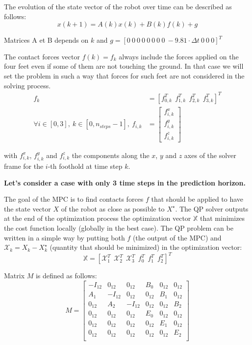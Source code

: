 \documentclass[a4paper,11pt]{article}
\begin{document}
The evolution of the state vector of the robot over time can be described as follows:
\begin{equation}
x(k+1) = A(k) x(k) + B(k) f(k) + g
\end{equation}

Matrices A et B depends on $k$ and $g = [0 ~ 0 ~ 0 ~ 0 ~ 0 ~ 0 ~ 0 ~ 0 ~ -9.81 \cdot \Delta t~ 0 ~ 0 ~ 0]^T$

The contact forces vector $f(k) = f_k$ always include the forces applied on the four feet even if some of them are not touching the ground. In that case we will set the problem in such a way that forces for such feet are not considered in the solving process.
\begin{align}
f_k &= [f_{0,k}^T ~~ f_{1,k}^T ~~ f_{2,k}^T ~~ f_{3,k}^T]^T \\
\forall i \in [0, 3],~k\in[0, n_{steps}-1], ~f_{i, k} &= \begin{bmatrix} f^x_{i,k} \\ f^y_{i,k} \\ f^z_{i,k} \end{bmatrix}
\end{align}

with $f^x_{i,k}$, $f^y_{i,k}$ and $f^z_{i,k}$ the components along the $x$, $y$ and $z$ axes of the solver frame for the $i$-th foothold at time step $k$.

\textbf{Let's consider a case with only 3 time steps in the prediction horizon.}

The goal of the MPC is to find contacts forces $f$ that should be applied to have the state vector $X$ of the robot as close as possible to $X^\star$. The QP solver outputs at the end of the optimization process the optimization vector $\mathbb{X}$ that minimizes the cost function locally (globally in the best case). The QP problem can be written in a simple way by putting both $f$ (the output of the MPC) and $\mathcal{X}_k = X_k - X_k^\star$ (quantity that should be minimized) in the optimization vector:
\begin{equation}
\mathbb{X} = [\mathcal{X}_1^T ~~ \mathcal{X}_2^T ~~ \mathcal{X}_3^T ~~ f_0^T ~~ f_1^T ~~ f_2^T ]^T
\end{equation}


Matrix $M$ is defined as follows:
\begin{equation}
M = \begin{bmatrix} 
-I_{12} & 0_{12} & 0_{12}  & B_0 & 0_{12} & 0_{12}  \\
A_1 & -I_{12} & 0_{12}  & 0_{12} & B_1 & 0_{12} \\
0_{12} & A_2 & -I_{12}  & 0_{12} & 0_{12} & B_2 \\
0_{12} & 0_{12} & 0_{12}  & E_0 & 0_{12} & 0_{12} \\
0_{12} & 0_{12} & 0_{12}  & 0_{12} & E_1 & 0_{12} \\
0_{12} & 0_{12} & 0_{12}  & 0_{12} & 0_{12} & E_2 \\ \end{bmatrix}
\end{equation}
\end{document}

